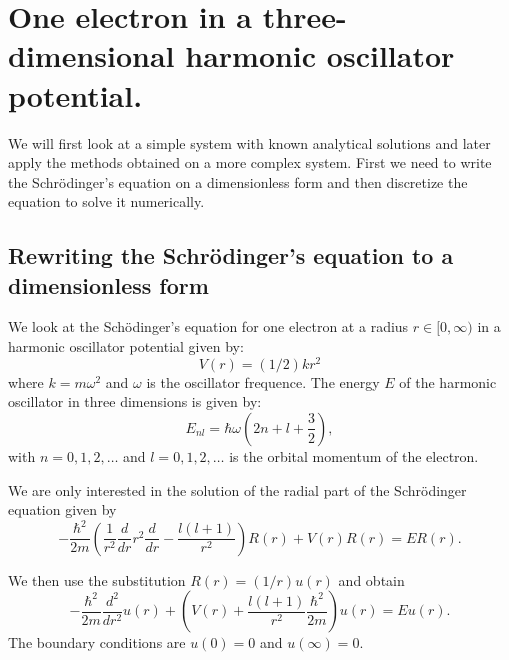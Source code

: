 \documentclass[11pt,a4wide]{article}
\begin{document}
\section{One electron in a three-dimensional harmonic oscillator potential.}
We will first look at a simple system with known analytical solutions and later apply the methods obtained on a more complex system. First we need to write the Schr\"odinger's equation on a dimensionless form and then discretize the equation to solve it numerically. %

\subsection{Rewriting the Schr\"odinger's equation to a dimensionless form} \label{sec:rewrite_sch}
We look at the Sch\"odinger's equation for one electron at a radius $r\in [0,\infty)$ in a harmonic oscillator potential given by: 
\[
V(r)= (1/2)kr^2
\]
where $k=m\omega^2$ and $\omega$ is the oscillator frequence. The energy $E$ of the harmonic oscillator in three dimensions is given by:
\[
E_{nl}=  \hbar \omega \left(2n+l+\frac{3}{2}\right),
\]
with $n=0,1,2,\dots$ and $l=0,1,2,\dots$ is the orbital momentum of the electron. 

We are only interested in the solution of the radial part of the Schr\"odinger equation given by
\begin{equation}
  -\frac{\hbar^2}{2 m} \left ( \frac{1}{r^2} \frac{d}{dr} r^2
  \frac{d}{dr} - \frac{l (l + 1)}{r^2} \right )R(r) 
     + V(r) R(r) = E R(r).
     \label{eq:schr_1}
\end{equation}

We then use the substitution $R(r) = (1/r) u(r)$ and obtain
\[
  -\frac{\hbar^2}{2 m} \frac{d^2}{dr^2} u(r) 
       + \left ( V(r) + \frac{l (l + 1)}{r^2}\frac{\hbar^2}{2 m}
                                    \right ) u(r)  = E u(r) .
\]
The boundary conditions are $u(0)=0$ and $u(\infty)=0$.
\end{document}
